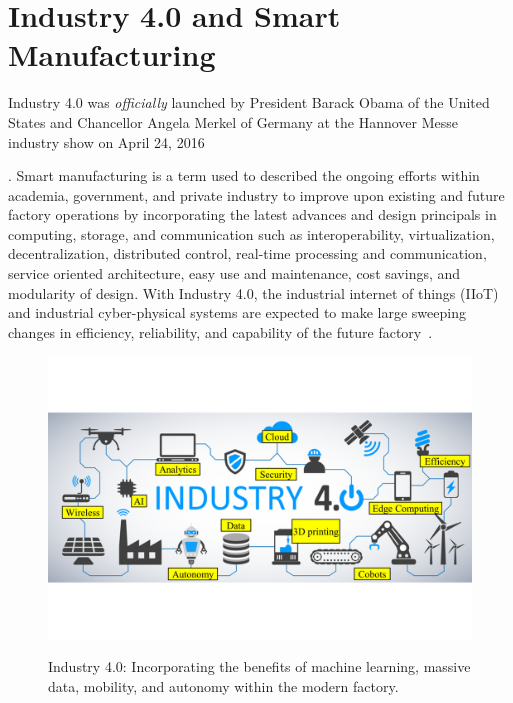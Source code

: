 \section{Industry 4.0 and Smart Manufacturing}
Industry 4.0 was \textit{officially} launched by President Barack Obama of the United States and Chancellor Angela Merkel of Germany at the Hannover Messe industry show on April 24, 2016{\cite{HannoverMesse2016:Report, HannoverMesse2016:MachineDesign}.  Smart manufacturing is a term used to described the ongoing efforts within academia, government, and private industry to improve upon existing and future factory operations by incorporating the latest advances and design principals in computing, storage, and communication such as interoperability, virtualization, decentralization, distributed control, real-time processing and communication, service oriented architecture, easy use and maintenance, cost savings, and modularity of design.  With Industry 4.0, the industrial internet of things (IIoT) and industrial cyber-physical systems are expected to make large sweeping changes in efficiency, reliability, and capability of the future factory~\cite{Raptis2019}.	

\begin{figure}[!tbp]
	\begin{center}
		\includegraphics[width=\textwidth]{chapter-intro/images/intro/forbes-i40-candell.png}
		\label{fig:intro:forbes-i40}
		\caption{Industry 4.0: Incorporating the benefits of machine learning, massive data, mobility, and autonomy within the modern factory.}
	\end{center}
\end{figure}

}
